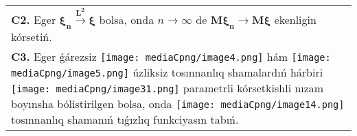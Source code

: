 \documentclass{article}
\begin{document}
\begin{tabular}{m{17cm}}
 \\
\textbf{C2.} Eger \(\mathbf{\xi}_{\mathbf{n}}\overset{\mathbf{L}^{\mathbf{2}}}{\rightarrow}\mathbf{\xi}\) bolsa, onda \(n \rightarrow \infty\) de \(\mathbf{M}\mathbf{\xi}_{\mathbf{n}}\mathbf{\rightarrow M\xi}\) ekenligin kórsetiń.
 \\
\textbf{C3.} Eger ǵárezsiz \texttt{[image: mediaCpng/image4.png]} hám \texttt{[image: mediaCpng/image5.png]} úzliksiz tosınnanlıq shamalardıń hárbiri \texttt{[image: mediaCpng/image31.png]} parametrli kórsetkishli nızam boyınsha bólistirilgen bolsa, onda \texttt{[image: mediaCpng/image14.png]} tosınnanlıq shamanıń tıǵızlıq funkciyasın tabıń.
 \\

\end{tabular}
\vspace{1cm}
\end{document}

